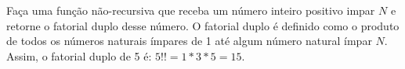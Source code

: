 
\question[10]

Faça uma função não-recursiva que receba um número inteiro positivo impar $N$ e retorne o fatorial duplo desse número. O fatorial duplo é definido como o produto de todos os números naturais ímpares de 1 até algum número natural  ímpar $N$. Assim, o fatorial duplo de 5 é: $5!! = 1*3*5 = 15$.